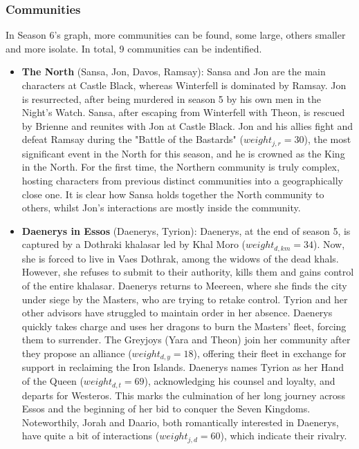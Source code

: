 \documentclass[10pt,twocolumn,letterpaper]{article}
\begin{document}
\subsubsection{Communities}

In Season 6's graph, more communities can be found, some large, others smaller and more isolate. In total, 9 communities can be indentified.

\begin{itemize}
    \item \textbf{The North} (Sansa, Jon, Davos, Ramsay): Sansa and Jon are the main characters at Castle Black, whereas Winterfell is dominated by Ramsay. Jon is resurrected, after being murdered in season 5 by his own men in the Night's Watch. Sansa, after escaping from Winterfell with Theon, is rescued by Brienne and reunites with Jon at Castle Black. Jon and his allies fight and defeat Ramsay during the "Battle of the Bastards" ($weight_{j,r}=30$), the most significant event in the North for this season, and he is crowned as the King in the North.  For the first time, the Northern community is truly complex, hosting characters from previous distinct communities into a geographically close one. It is clear how Sansa holds together the North community to others, whilst Jon's interactions are mostly inside the community.
    \item \textbf{Daenerys in Essos} (Daenerys, Tyrion): Daenerys, at the end of season 5, is captured by a Dothraki khalasar led by Khal Moro ($weight_{d,km}=34$). Now, she is forced to live in Vaes Dothrak, among the widows of the dead khals. However, she refuses to submit to their authority, kills them and gains control of the entire khalasar. Daenerys returns to Meereen, where she finds the city under siege by the Masters, who are trying to retake control. Tyrion and her other advisors have struggled to maintain order in her absence. Daenerys quickly takes charge and uses her dragons to burn the Masters' fleet, forcing them to surrender. The Greyjoys (Yara and Theon) join her community after they propose an alliance ($weight_{d,y}=18$), offering their fleet in exchange for support in reclaiming the Iron Islands. Daenerys names Tyrion as her Hand of the Queen ($weight_{d,t}=69$), acknowledging his counsel and loyalty, and departs for Westeros. This marks the culmination of her long journey across Essos and the beginning of her bid to conquer the Seven Kingdoms. Noteworthily, Jorah and Daario, both romantically interested in Daenerys, have quite a bit of interactions ($weight_{j,d}=60$), which indicate their rivalry.

\end{itemize}
\end{document}

